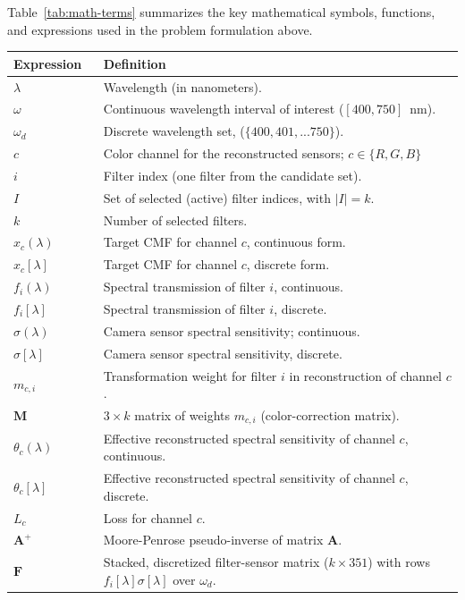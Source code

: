 Table~\ref{tab:math-terms} summarizes the key mathematical symbols, functions, and expressions used in the problem formulation above.

\begin{table}[H]
\centering
\begin{tabular}{@{}p{0.20\linewidth}p{0.80\linewidth}@{}}
Expression & Definition \\
\midrule
$\lambda$ & Wavelength (in nanometers). \\
$\omega$ & Continuous wavelength interval of interest ($[400,750]$~nm). \\
$\omega_d$ & Discrete wavelength set, ($\{400,401,...750\}$). \\
$c$ & Color channel for the reconstructed sensors; $c\in\{R,G,B\}$ \\
$i$ & Filter index (one filter from the candidate set). \\
$I$ & Set of selected (active) filter indices, with $|I|=k$. \\
$k$ & Number of selected filters. \\
$x_c(\lambda)$ & Target CMF for channel $c$, continuous form. \\
$x_c[\lambda]$ & Target CMF for channel $c$, discrete form. \\
$f_i(\lambda)$ & Spectral transmission of filter $i$, continuous. \\
$f_i[\lambda]$ & Spectral transmission of filter $i$, discrete. \\
$\sigma(\lambda)$ & Camera sensor spectral sensitivity; continuous. \\
$\sigma[\lambda]$ & Camera sensor spectral sensitivity, discrete. \\
$m_{c,i}$ & Transformation weight for filter $i$ in reconstruction of channel $c$.\\
$\boldsymbol{M}$ & $3\times k$ matrix of weights $m_{c,i}$ (color-correction matrix). \\
$\theta_c(\lambda)$ & Effective reconstructed spectral sensitivity of channel $c$, continuous. \\
$\theta_c[\lambda]$ & Effective reconstructed spectral sensitivity of channel $c$, discrete. \\
$L_c$ & Loss for channel $c$.\\
$\boldsymbol{A}^+$ & Moore-Penrose pseudo-inverse of matrix $\boldsymbol{A}$. \\
$\boldsymbol{F}$ & Stacked, discretized filter-sensor matrix ($k\times 351$) with rows $f_i[\lambda]\sigma[\lambda]$ over $\omega_d$. \\

\end{tabular}
\end{table}
